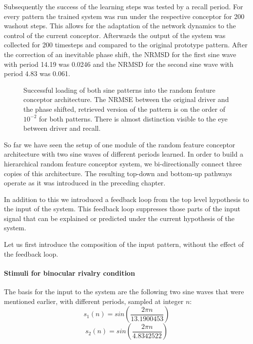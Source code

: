 \documentclass[utf8]{frontiersSCNS} %
\begin{document}
	Subsequently the success of the learning steps was tested by a recall period. For every pattern the trained system was run under the respective conceptor for 200 washout steps. This allows for the adaptation of the network dynamics to the control of the current conceptor. Afterwards the output of the system was collected for 200 timesteps and compared to the original prototype pattern. After the correction of an inevitable phase shift, the NRMSD for the first sine wave with period 14.19 was 0.0246 and the NRMSD for the second sine wave with period 4.83 was 0.061. 
	
	    \begin{figure}
	        \centering
	       	
	      	\caption[Successful loading of both sine patterns in RFC]{Successful loading of both sine patterns into the random feature conceptor architecture. The NRMSE between the original driver and the phase shifted, retrieved version of the pattern is on the order of $10^{-2}$ for both patterns. There is almost distinction visible to the eye between driver and recall.}
	   	    \label{loading}
	    \end{figure}
	
	So far we have seen the setup of one module of the random feature conceptor architecture with two sine waves of different periods learned. In order to build a hierarchical random feature conceptor system, we bi-directionally connect three copies of this architecture. The resulting top-down and bottom-up pathways operate as it was introduced in the preceding chapter. 
	
	
    In addition to this we introduced a feedback loop from the top level hypothesis to the input of the system. This feedback loop suppresses those parts of the input signal that can be explained or predicted under the current hypothesis of the system.
     
    Let us first introduce the composition of the input pattern, without the effect of the feedback loop.
    
    \paragraph{Stimuli for binocular rivalry condition}
    The basis for the input to the system are the following two sine waves that were mentioned earlier, with different periods, sampled at integer $n$:
    \begin{equation}
		s_1(n) = sin(\frac{2 \pi n}{13.1900453})
	\end{equation}
	\begin{equation}
		s_2(n) = sin(\frac{2 \pi n}{4.8342522})
	\end{equation}
	
\end{document}
